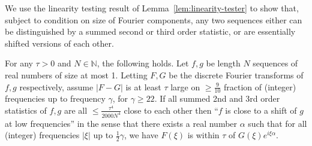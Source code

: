 \documentclass[11pt]{article}
\theoremstyle{plain}
\begin{document}
We use the linearity testing result of Lemma~\ref{lem:linearity-tester} to show that, subject to condition on size of Fourier components, any two sequences either can be distinguished by a summed second or third order statistic, or are essentially shifted versions of each other. 

\begin{lemma}\label{lem:contrapositive}
For any $\tau > 0$ and $N \in \mathbb{N}$, the following holds. 
Let $f,g$ be length $N$ sequences of real numbers of size at most 1. Letting $F,G$ be the discrete Fourier transforms of $f,g$ respectively, assume $|F-G|$ is at least $\tau$ large on $\geq\frac{9}{10}$ fraction of (integer) frequencies up to frequency $\gamma$, for $\gamma\geq 22$. If all summed 2nd and 3rd order statistics of $f,g$ are all $\leq \frac{\tau^4}{2000N^4}$ close to each other then ``$f$ is close to a shift of $g$ at low frequencies'' in the sense that there exists a real number $\alpha$ such that for all (integer) frequencies $|\xi|$ up to $\frac{1}{2}\gamma$, we have $F(\xi)$ is within $\tau$ of $G(\xi) e^{i\xi \alpha}$.
\end{lemma}
\end{document}
